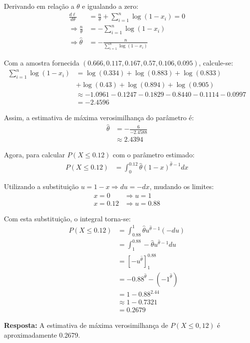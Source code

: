 \documentclass[a4paper,12pt]{article}
\begin{document}
\begin{enumerate}
\begin{mdframed}[backgroundcolor=gray!10, linewidth=0pt, innertopmargin=10pt, innerbottommargin=10pt]
    Derivando em relação a \( \theta \) e igualando a zero:
    \begin{align*}
    \frac{d\ell}{d\theta} &= \frac{n}{\theta} + \sum_{i=1}^{n} \log(1 - x_i) = 0 \\
    \Rightarrow \frac{n}{\theta} &= -\sum_{i=1}^{n} \log(1 - x_i) \\
    \Rightarrow \hat{\theta} &= -\frac{n}{\sum_{i=1}^{n} \log(1 - x_i)}
    \end{align*}

    Com a amostra fornecida \( (0.666, 0.117, 0.167, 0.57, 0.106, 0.095) \), calcule-se:
    \begin{align*}
    \sum_{i=1}^{n} \log(1 - x_i) &= \log(0.334) + \log(0.883) + \log(0.833) \\
    &+ \log(0.43) + \log(0.894) + \log(0.905) \\
    &\approx -1.0961 -0.1247 -0.1829 -0.8440 -0.1114 -0.0997 \\
    &= -2.4596
    \end{align*}

    Assim, a estimativa de máxima verosimilhança do parâmetro é:
    \begin{align*}
    \hat{\theta} &= -\frac{6}{-2.4588} \\
    &\approx 2.4394
    \end{align*}

    Agora, para calcular \( P(X \leq 0.12) \) com o parâmetro estimado:
    \begin{align*}
    P(X \leq 0.12) &= \int_0^{0.12} \hat{\theta}(1 - x)^{\hat{\theta} - 1} dx
    \end{align*}

    Utilizando a substituição \( u = 1 - x \Rightarrow du = -dx \), mudando os limites:
    \begin{align*}
    x = 0 &\Rightarrow u = 1 \\
    x = 0.12 &\Rightarrow u = 0.88
    \end{align*}

    Com esta substituição, o integral torna-se:
    \begin{align*}
    P(X \leq 0.12) &= \int_{0.88}^{1} \hat{\theta} u^{\hat{\theta} - 1} (-du) \\
    &= \int_{1}^{0.88} -\hat{\theta} u^{\hat{\theta} - 1} du \\
    &= \left[ -u^{\hat{\theta}} \right]_{1}^{0.88} \\
    &= -0.88^{\hat{\theta}} - (-1^{\hat{\theta}}) \\
    &= 1 - 0.88^{2.44} \\
    &\approx 1 - 0.7321 \\
    &= 0.2679
    \end{align*}

    \textbf{Resposta:} A estimativa de máxima verosimilhança de \( P(X \leq 0{,}12) \) é aproximadamente 0.2679.
    \end{mdframed}

\end{enumerate}
\end{document}
